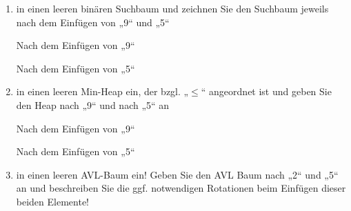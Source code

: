 \documentclass{bschlangaul-aufgabe}
\begin{document}
\begin{enumerate}


\item in einen leeren binären Suchbaum und zeichnen Sie den Suchbaum
jeweils nach dem Einfügen von „9“ und „5“

\begin{bBaum}{Nach dem Einfügen von „9“}
\end{bBaum}

\begin{bBaum}{Nach dem Einfügen von „5“}
\end{bBaum}


\item in einen leeren Min-Heap ein, der bzgl. „$\leq$“ angeordnet ist und
geben Sie den Heap nach „9“ und nach „5“ an

\begin{bBaum}{Nach dem Einfügen von „9“}
\end{bBaum}

\begin{bBaum}{Nach dem Einfügen von „5“}
\end{bBaum}


\item in einen leeren AVL-Baum ein! Geben Sie den AVL Baum nach „2“ und
„5“ an und beschreiben Sie die ggf. notwendigen Rotationen beim Einfügen
dieser beiden Elemente!


\end{enumerate}
\end{document}
